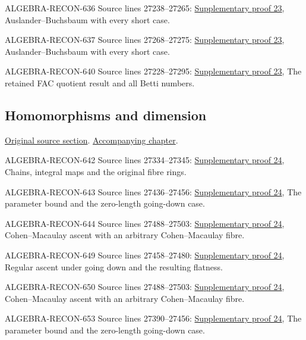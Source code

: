 \begin{AlgebraSourceRoutes}
\item[ALGEBRA-RECON-636] Source lines 27238--27265: \hyperlink{algebra_regular_ab_notes_20260928}{Supplementary proof 23}, Auslander–Buchsbaum with every short case.
\item[ALGEBRA-RECON-637] Source lines 27268--27275: \hyperlink{algebra_regular_ab_notes_20260928}{Supplementary proof 23}, Auslander–Buchsbaum with every short case.
\item[ALGEBRA-RECON-640] Source lines 27228--27295: \hyperlink{algebra_regular_ab_notes_20260928}{Supplementary proof 23}, The retained FAC quotient result and all Betti numbers.
\end{AlgebraSourceRoutes}

\subsection{Homomorphisms and dimension}
\hypertarget{algebra-source-section-homomorphism-dimension}{}
\noindent\href{https://github.com/stacks/stacks-project/blob/a04446e57ec1fbc252a871afcec7752fb2807b14/algebra.tex\#L27305}{Original source section}. \href{algebra.pdf\#nameddest=section-homomorphism-dimension}{Accompanying chapter}.

\begin{AlgebraSourceRoutes}
\item[ALGEBRA-RECON-642] Source lines 27334--27345: \hyperlink{algebra_dimension_maps_notes_20260928}{Supplementary proof 24}, Chains, integral maps and the original fibre rings.
\item[ALGEBRA-RECON-643] Source lines 27436--27456: \hyperlink{algebra_dimension_maps_notes_20260928}{Supplementary proof 24}, The parameter bound and the zero-length going-down case.
\item[ALGEBRA-RECON-644] Source lines 27488--27503: \hyperlink{algebra_dimension_maps_notes_20260928}{Supplementary proof 24}, Cohen–Macaulay ascent with an arbitrary Cohen–Macaulay fibre.
\item[ALGEBRA-RECON-649] Source lines 27458--27480: \hyperlink{algebra_dimension_maps_notes_20260928}{Supplementary proof 24}, Regular ascent under going down and the resulting flatness.
\item[ALGEBRA-RECON-650] Source lines 27488--27503: \hyperlink{algebra_dimension_maps_notes_20260928}{Supplementary proof 24}, Cohen–Macaulay ascent with an arbitrary Cohen–Macaulay fibre.
\item[ALGEBRA-RECON-653] Source lines 27390--27456: \hyperlink{algebra_dimension_maps_notes_20260928}{Supplementary proof 24}, The parameter bound and the zero-length going-down case.
\end{AlgebraSourceRoutes}

